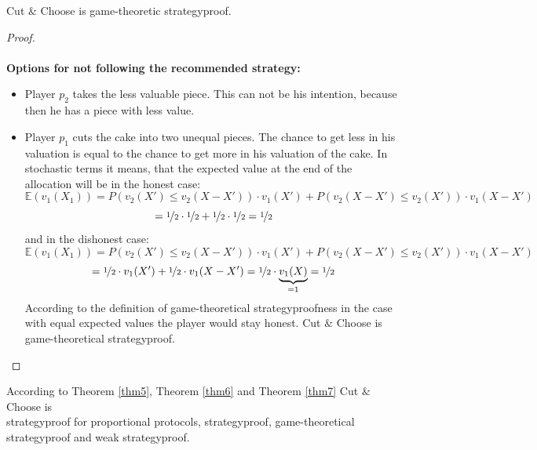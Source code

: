 \begin{lem}
\label{thm7}
Cut $\&$ Choose is game-theoretic strategyproof.
\end{lem}
\begin{proof}
\textcolor{white}{x}\\\\
\textbf{Options for not following the recommended strategy:}
\begin{itemize}
\item Player $p_2$ takes the less valuable piece. This can not be his intention, because then he has a piece with less value.
\item Player $p_1$ cuts the cake into two unequal pieces. The chance to get less in his valuation is equal to the chance to get more in his valuation of the cake. In stochastic terms it means, that the expected value at the end of the allocation will be in the honest case: $$ \mathbb{E}(v_1(X_1))=P(v_2(X')\leq v_2(X-X'))\cdot v_1(X')+P(v_2(X-X')\leq v_2(X'))\cdot v_1(X-X')$$$$=\nicefrac{1}{2} \cdot \nicefrac{1}{2}+\nicefrac{1}{2} \cdot \nicefrac{1}{2}=\nicefrac{1}{2} $$ and in the dishonest case: $$ \mathbb{E}(v_1(X_1))=P(v_2(X')\leq v_2(X-X'))\cdot v_1(X')+P(v_2(X-X')\leq v_2(X'))\cdot v_1(X-X')$$$$=\nicefrac{1}{2} \cdot v_1(X') +\nicefrac{1}{2} \cdot v_1(X-X') =\nicefrac{1}{2} \cdot \underbrace{v_1(X)}_{=1}=\nicefrac{1}{2}$$ According to the definition of game-theoretical strategyproofness in the case with equal expected values the player would stay honest. Cut $\&$ Choose is game-theoretical strategyproof.
\end{itemize}
\end{proof}
\begin{bezeichnungen}
According to Theorem \ref{thm5}, Theorem \ref{thm6} and Theorem \ref{thm7} Cut $\&$ Choose is\\strategyproof for proportional protocols, strategyproof, game-theoretical strategyproof and weak strategyproof.
\end{bezeichnungen}
\pagebreak
